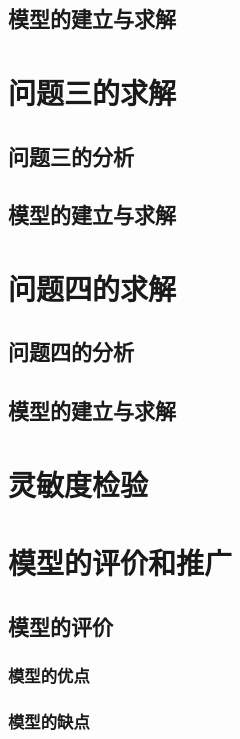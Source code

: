\documentclass{cumcmthesis}
\begin{document}
\subsection{模型的建立与求解}


\section{问题三的求解}

\subsection{问题三的分析}


\subsection{模型的建立与求解}


\section{问题四的求解}

\subsection{问题四的分析}
        

\subsection{模型的建立与求解}


\section{灵敏度检验}

\section{模型的评价和推广}
\subsection{模型的评价}
\subsubsection{模型的优点}

\subsubsection{模型的缺点}
   
\end{document}
